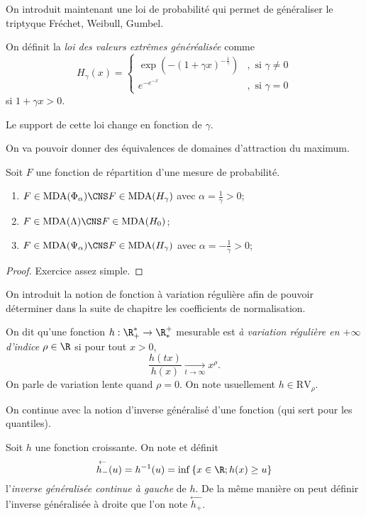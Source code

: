 \documentclass[10p,a4paper,reqno,titlepage]{report}
\begin{document}
On introduit maintenant une loi de probabilité qui permet de généraliser le triptyque Fréchet, Weibull, Gumbel.
\begin{de}
	On définit la \textit{loi des valeurs extrêmes généréalisée} comme 
	$$ H_\gamma (x)= \left\{ \begin{array}{ll} \exp(-(1+\gamma x ) ^{-\tfrac{1}{\gamma}}) &, \text{ si } \gamma \neq 0\\
		e^{-e^{-x}} &,\text{ si }\gamma = 0	\end{array}\right.$$
	si $1+  \gamma x > 0.$
	\end{de}
\begin{rem}
	Le support de cette loi change en fonction de $\gamma$.
\end{rem}
On va pouvoir donner des équivalences de domaines d'attraction du maximum.
\begin{prop}
Soit $F$ une fonction de répartition d'une mesure de probabilité. \
\begin{enumerate}
	\item $F\in\mathrm{MDA}(\Phi_\alpha) \CNS F \in \mathrm{MDA}(H_\gamma)$ avec $\alpha = \frac{1}{\gamma} >0$;
	\item $F\in\mathrm{MDA}(\Lambda) \CNS F \in \mathrm{MDA}(H_0)$;
	\item $F\in\mathrm{MDA}(\Psi_\alpha) \CNS F \in \mathrm{MDA}(H_\gamma)$ avec $\alpha = -\frac{1}{\gamma} >0$;
\end{enumerate}
\end{prop}
\begin{proof}
Exercice assez simple.
\end{proof}
On introduit la notion de fonction à variation régulière afin de pouvoir déterminer dans la suite de chapitre les coefficients de normalisation.
\begin{de}
	On dit qu'une fonction $h : \R_+ ^* \to \R_* ^+$ mesurable est \textit{à variation régulière en $+\infty$ d'indice $\rho\in\R$} si pour tout $x > 0$, 
	$$ \frac{h(tx)}{h(x)} \underset{t \to \infty}{\longrightarrow} x^\rho.$$
	On parle de variation lente quand $\rho = 0$.
	On note usuellement $h \in \mathrm{RV}_\rho.$
\end{de}
On continue avec la notion d'inverse généralisé d'une fonction (qui sert pour les quantiles).
\begin{de}
	Soit $h$ une fonction croissante. On note et définit
	$$ \overset{\leftarrow}{h_- }(u) = h^{-1} (u)= \inf\left\{ x \in \R; h (x) \geq u\right\}$$
	l'\textit{inverse généralisée continue à gauche} de $h$.
	De la même manière on peut définir l'inverse généralisée à droite que l'on note $\overset{\leftarrow}{h_+ }$.
\end{de}
\end{document}
